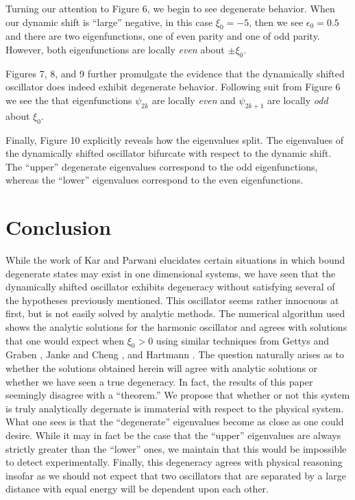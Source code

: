 \documentclass[12pt]{article}
\begin{document}
\par Turning our attention to Figure 6, we begin to see degenerate behavior. When our dynamic shift is ``large'' negative, in this case $\xi_0=-5$, then we see $\epsilon_0 = 0.5$ and there are two eigenfunctions, one of even parity and one of odd parity. However, both eigenfunctions are locally \textit{even} about $\pm \xi_0$.

\par Figures 7, 8, and 9 further promulgate the evidence that the dynamically shifted oscillator does indeed exhibit degenerate behavior. Following suit from Figure 6 we see the that eigenfunctions $\psi_{2k}$ are locally \textit{even} and $\psi_{2k+1}$ are locally \textit{odd} about $\xi_0$.

\par Finally, Figure 10 explicitly reveals how the eigenvalues split. The eigenvalues of the dynamically shifted oscillator bifurcate with respect to the dynamic shift. The ``upper'' degenerate eigenvalues correspond to the odd eigenfunctions, whereas the ``lower'' eigenvalues correspond to the even eigenfunctions.

\section{Conclusion}
While the work of Kar and Parwani \cite{Kar-Parwani} elucidates certain situations in which bound degenerate states may exist in one dimensional systems, we have seen that the dynamically shifted oscillator exhibits degeneracy without satisfying several of the hypotheses previously mentioned. This oscillator seems rather innocuous at first, but is not easily solved by analytic methods. The numerical algorithm used shows the analytic solutions for the harmonic oscillator and agrees with solutions that one would expect when $\xi_0>0$ using similar techniques from Gettys and Graben \cite{Gettys-Graben}, Janke and Cheng \cite{Janke-Cheng}, and Hartmann \cite{Hartmann}. The question naturally arises as to whether the solutions obtained herein will agree with analytic solutions or whether we have seen a true degeneracy. In fact, the results of this paper seemingly disagree with a ``theorem.''  We propose that whether or not this system is truly analytically degernate is immaterial with respect to the physical system. What one sees is that the ``degenerate'' eigenvalues become as close as one could desire. While it may in fact be the case that the ``upper'' eigenvalues are always strictly greater than the ``lower'' ones, we maintain that this would be impossible to detect experimentally. Finally, this degeneracy agrees with physical reasoning insofar as we should not expect that two oscillators that are separated by a large distance with equal energy will be dependent upon each other. 
\end{document}
